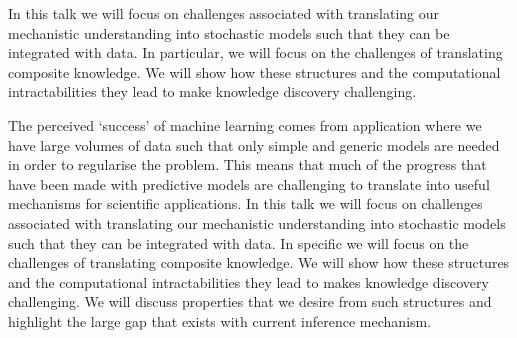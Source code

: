 In this talk we will focus on challenges associated with translating our mechanistic understanding into stochastic models such that they can be integrated with data. In particular, we will focus on the challenges of translating composite knowledge. We will show how these structures and the computational intractabilities they lead to make knowledge discovery challenging. 

The perceived `success' of machine learning comes from application where we have large volumes of data such that only simple and generic models are needed in order to regularise the problem. This means that much of the progress that have been made with predictive models are challenging to translate into useful mechanisms for scientific applications. In this talk we will focus on challenges associated with translating our mechanistic understanding into stochastic models such that they can be integrated with data. In specific we will focus on the challenges of translating composite knowledge. We will show how these structures and the computational intractabilities they lead to makes knowledge discovery challenging. We will discuss properties that we desire from such structures and highlight the large gap that exists with current inference mechanism.
